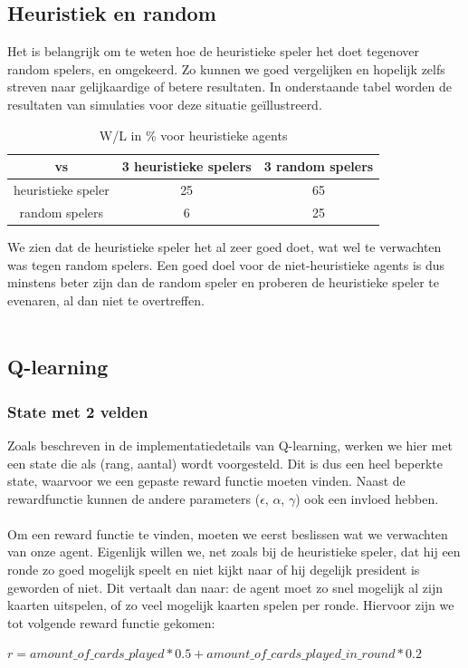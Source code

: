 \documentclass[11pt]{article}
\begin{document}
\subsection{Heuristiek en random}
Het is belangrijk om te weten hoe de heuristieke speler het doet tegenover random spelers, en omgekeerd. Zo kunnen we goed vergelijken en hopelijk zelfs streven naar gelijkaardige of betere resultaten. In onderstaande tabel worden de resultaten van simulaties voor deze situatie geïllustreerd.
\begin{table}[H]
        \centering
        \begin{tabular}{|c|c|c|}
                \hline
                  vs                & 3 heuristieke spelers & 3 random spelers \\
                \hline
                 heuristieke speler & 25         & 65\\
                 random spelers     & 6         & 25\\
                \hline
        \end{tabular}
        \caption{W/L in \% voor heuristieke agents}
\end{table}

We zien dat de heuristieke speler het al zeer goed doet, wat wel te verwachten was tegen random spelers. Een goed doel voor de niet-heuristieke agents is dus minstens beter zijn dan de random speler en proberen de heuristieke speler te evenaren, al dan niet te overtreffen.\\\\


\subsection{Q-learning}
\subsubsection{State met 2 velden}
Zoals beschreven in de implementatiedetails van Q-learning, werken we hier met een state die als (rang, aantal) wordt voorgesteld. Dit is dus een heel beperkte state, waarvoor we een gepaste reward functie moeten vinden. Naast de rewardfunctie kunnen de andere parameters ($\epsilon$, $\alpha$, $\gamma$) ook een invloed hebben.\\\\
Om een reward functie te vinden, moeten we eerst beslissen wat we verwachten van onze agent. Eigenlijk willen we, net zoals bij de heuristieke speler, dat hij een ronde zo goed mogelijk speelt en niet kijkt naar of hij degelijk president is geworden of niet. Dit vertaalt dan naar: de agent moet zo snel mogelijk al zijn kaarten uitspelen, of zo veel mogelijk kaarten spelen per ronde. Hiervoor zijn we tot volgende reward functie gekomen:
\begin{center}
$r = amount\_of\_cards\_played * 0.5 + amount\_of\_cards\_played\_in\_round * 0.2$
\end{center}
\end{document}
